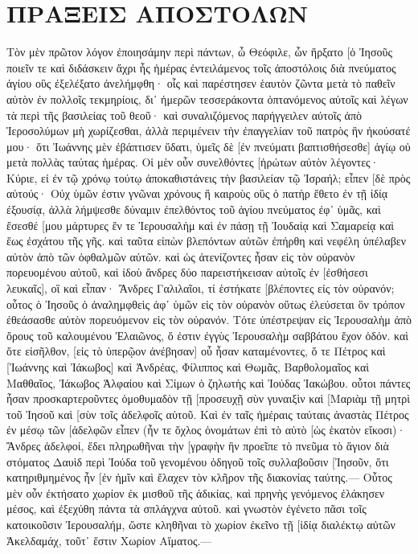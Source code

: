 \section{ΠΡΑΞΕΙΣ ΑΠΟΣΤΟΛΩΝ}
Τὸν μὲν πρῶτον λόγον ἐποιησάμην περὶ πάντων, ὦ Θεόφιλε, ὧν ἤρξατο [ὁ Ἰησοῦς ποιεῖν τε καὶ διδάσκειν 
ἄχρι ἧς ἡμέρας ἐντειλάμενος τοῖς ἀποστόλοις διὰ πνεύματος ἁγίου οὓς ἐξελέξατο ἀνελήμφθη· 
οἷς καὶ παρέστησεν ἑαυτὸν ζῶντα μετὰ τὸ παθεῖν αὐτὸν ἐν πολλοῖς τεκμηρίοις, δι᾽ ἡμερῶν τεσσεράκοντα ὀπτανόμενος αὐτοῖς καὶ λέγων τὰ περὶ τῆς βασιλείας τοῦ θεοῦ· 
καὶ συναλιζόμενος παρήγγειλεν αὐτοῖς ἀπὸ Ἱεροσολύμων μὴ χωρίζεσθαι, ἀλλὰ περιμένειν τὴν ἐπαγγελίαν τοῦ πατρὸς ἣν ἠκούσατέ μου· 
ὅτι Ἰωάννης μὲν ἐβάπτισεν ὕδατι, ὑμεῖς δὲ [ἐν πνεύματι βαπτισθήσεσθε] ἁγίῳ οὐ μετὰ πολλὰς ταύτας ἡμέρας. 
Οἱ μὲν οὖν συνελθόντες [ἠρώτων αὐτὸν λέγοντες· Κύριε, εἰ ἐν τῷ χρόνῳ τούτῳ ἀποκαθιστάνεις τὴν βασιλείαν τῷ Ἰσραήλ; 
εἶπεν [δὲ πρὸς αὐτούς· Οὐχ ὑμῶν ἐστιν γνῶναι χρόνους ἢ καιροὺς οὓς ὁ πατὴρ ἔθετο ἐν τῇ ἰδίᾳ ἐξουσίᾳ, 
ἀλλὰ λήμψεσθε δύναμιν ἐπελθόντος τοῦ ἁγίου πνεύματος ἐφ᾽ ὑμᾶς, καὶ ἔσεσθέ [μου μάρτυρες ἔν τε Ἰερουσαλὴμ καὶ ἐν πάσῃ τῇ Ἰουδαίᾳ καὶ Σαμαρείᾳ καὶ ἕως ἐσχάτου τῆς γῆς. 
καὶ ταῦτα εἰπὼν βλεπόντων αὐτῶν ἐπήρθη καὶ νεφέλη ὑπέλαβεν αὐτὸν ἀπὸ τῶν ὀφθαλμῶν αὐτῶν. 
καὶ ὡς ἀτενίζοντες ἦσαν εἰς τὸν οὐρανὸν πορευομένου αὐτοῦ, καὶ ἰδοὺ ἄνδρες δύο παρειστήκεισαν αὐτοῖς ἐν [ἐσθήσεσι λευκαῖς], 
οἳ καὶ εἶπαν· Ἄνδρες Γαλιλαῖοι, τί ἑστήκατε [βλέποντες εἰς τὸν οὐρανόν; οὗτος ὁ Ἰησοῦς ὁ ἀναλημφθεὶς ἀφ᾽ ὑμῶν εἰς τὸν οὐρανὸν οὕτως ἐλεύσεται ὃν τρόπον ἐθεάσασθε αὐτὸν πορευόμενον εἰς τὸν οὐρανόν. 
Τότε ὑπέστρεψαν εἰς Ἰερουσαλὴμ ἀπὸ ὄρους τοῦ καλουμένου Ἐλαιῶνος, ὅ ἐστιν ἐγγὺς Ἰερουσαλὴμ σαββάτου ἔχον ὁδόν. 
καὶ ὅτε εἰσῆλθον, [εἰς τὸ ὑπερῷον ἀνέβησαν] οὗ ἦσαν καταμένοντες, ὅ τε Πέτρος καὶ [Ἰωάννης καὶ Ἰάκωβος] καὶ Ἀνδρέας, Φίλιππος καὶ Θωμᾶς, Βαρθολομαῖος καὶ Μαθθαῖος, Ἰάκωβος Ἁλφαίου καὶ Σίμων ὁ ζηλωτὴς καὶ Ἰούδας Ἰακώβου. 
οὗτοι πάντες ἦσαν προσκαρτεροῦντες ὁμοθυμαδὸν τῇ [προσευχῇ σὺν γυναιξὶν καὶ [Μαριὰμ τῇ μητρὶ τοῦ Ἰησοῦ καὶ [σὺν τοῖς ἀδελφοῖς αὐτοῦ. 
Καὶ ἐν ταῖς ἡμέραις ταύταις ἀναστὰς Πέτρος ἐν μέσῳ τῶν [ἀδελφῶν εἶπεν (ἦν τε ὄχλος ὀνομάτων ἐπὶ τὸ αὐτὸ [ὡς ἑκατὸν εἴκοσι)· 
Ἄνδρες ἀδελφοί, ἔδει πληρωθῆναι τὴν [γραφὴν ἣν προεῖπε τὸ πνεῦμα τὸ ἅγιον διὰ στόματος Δαυὶδ περὶ Ἰούδα τοῦ γενομένου ὁδηγοῦ τοῖς συλλαβοῦσιν [Ἰησοῦν, 
ὅτι κατηριθμημένος ἦν [ἐν ἡμῖν καὶ ἔλαχεν τὸν κλῆρον τῆς διακονίας ταύτης.— 
Οὗτος μὲν οὖν ἐκτήσατο χωρίον ἐκ μισθοῦ τῆς ἀδικίας, καὶ πρηνὴς γενόμενος ἐλάκησεν μέσος, καὶ ἐξεχύθη πάντα τὰ σπλάγχνα αὐτοῦ. 
καὶ γνωστὸν ἐγένετο πᾶσι τοῖς κατοικοῦσιν Ἰερουσαλήμ, ὥστε κληθῆναι τὸ χωρίον ἐκεῖνο τῇ [ἰδίᾳ διαλέκτῳ αὐτῶν Ἁκελδαμάχ, τοῦτ᾽ ἔστιν Χωρίον Αἵματος.— 
